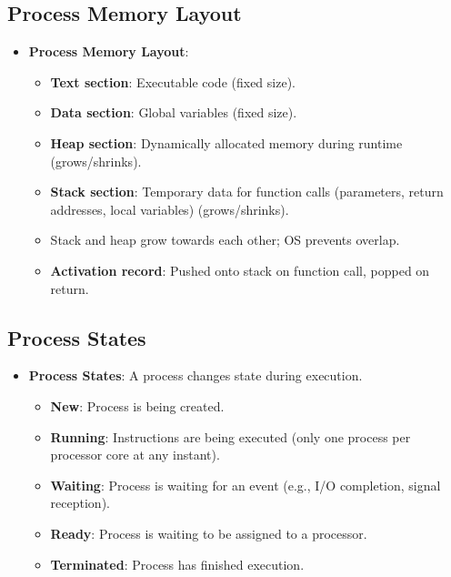\subsection{Process Memory Layout}
\begin{itemize}
    \item \textbf{Process Memory Layout}:
        \begin{itemize}
            \item \textbf{Text section}: Executable code (fixed size).
            \item \textbf{Data section}: Global variables (fixed size).
            \item \textbf{Heap section}: Dynamically allocated memory during runtime (grows/shrinks).
            \item \textbf{Stack section}: Temporary data for function calls (parameters, return addresses, local variables) (grows/shrinks).
            \item Stack and heap grow towards each other; OS prevents overlap.
            \item \textbf{Activation record}: Pushed onto stack on function call, popped on return.
        \end{itemize}
\end{itemize}

\subsection{Process States}
\begin{itemize}
    \item \textbf{Process States}: A process changes state during execution.
        \begin{itemize}
            \item \textbf{New}: Process is being created.
            \item \textbf{Running}: Instructions are being executed (only one process per processor core at any instant).
            \item \textbf{Waiting}: Process is waiting for an event (e.g., I/O completion, signal reception).
            \item \textbf{Ready}: Process is waiting to be assigned to a processor.
            \item \textbf{Terminated}: Process has finished execution.
        \end{itemize}
\end{itemize}


